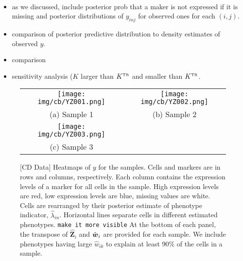 \documentclass[12pt,]{article}
\def\Z{\bm{Z}}
\newcommand{\true}{{\mbox{\tiny TR}}}
\newcommand{\bw}{\mbox{\boldmath $w$}}
\begin{document}
{\tt 
\begin{itemize}
\item as we discussed, include posterior prob that a maker is not expressed if it is missing and posterior distributions of $y_{inj}$ for observed ones for each $(i,j)$.

\item comparison of posterior predictive distribution to density estimates of observed $y$.

\item comparison

\item sensitivity analysis ($K$ larger than $K^\true$ and smaller than $K^\true$.

\end{itemize}
}



\begin{figure}[ht!]
  \begin{center}
\begin{tabular}{cc}
\texttt{[image: img/cb/YZ001.png]}&
\texttt{[image: img/cb/YZ002.png]}\\
(a) Sample 1 & (b) Sample 2 \\
\texttt{[image: img/cb/YZ003.png]} &\\
(c) Sample 3 & \\
  \end{tabular}
 \end{center}
 \vspace{-0.05in}
\caption{[CD Data]  Heatmaps of $y$ for the samples. Cells and markers are in
rows and columns, respectively. Each column contains the expression levels of
a marker for all cells in the sample. High expression levels are red, low
expression levels are blue, missing values are white.   Cells are rearranged
by their posterior estimate of phenotype indicator, $\hat{\lambda}_{in}$.
Horizontal lines separate cells in different estimated phenotypes.
%
{\tt make it more visible}
%
At the bottom of each panel, the transpose of $\hat{\Z}_i$
and $\hat{\bw}_i$ are provided for each sample. We include phenotypes having
large $\hat{w}_{ik}$ to explain at least 90\% of the cells in a sample.}
\label{fig:cb-post-Z}
\end{figure}

\end{document}
